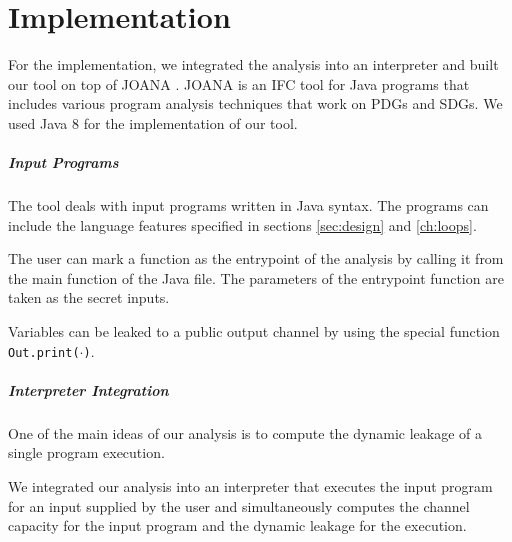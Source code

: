 \chapter{Implementation}\label{ch:impl}

For the implementation, we integrated the analysis into an interpreter and built our tool on top of JOANA \cite{joana}. JOANA is an IFC tool for Java programs that includes various program analysis techniques that work on PDGs and SDGs. We used Java 8 for the implementation of our tool.

\paragraph{Input Programs}
The tool deals with input programs written in Java syntax. The programs can include the language features specified in sections \ref{sec:design} and \ref{ch:loops}.

The user can mark a function as the entrypoint of the analysis by calling it from the main function of the Java file. The parameters of the entrypoint function are taken as the secret inputs.

Variables can be leaked to a public output channel by using the special function \texttt{Out.print($\cdot$)}.

\paragraph{Interpreter Integration}
One of the main ideas of our analysis is to compute the dynamic leakage of a single program execution.

We integrated our analysis into an interpreter that executes the input program for an input supplied by the user and simultaneously computes the channel capacity for the input program and the dynamic leakage for the execution.

